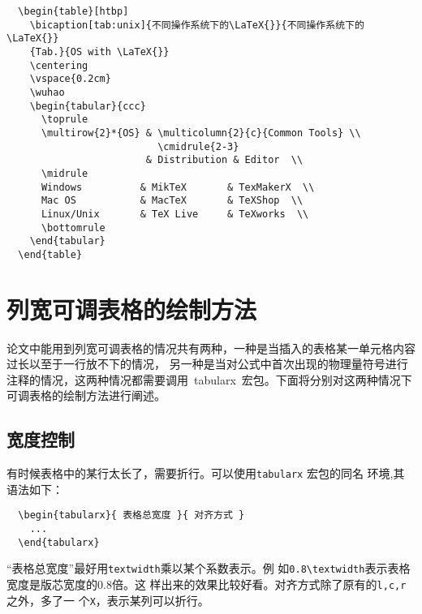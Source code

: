\begin{lstlisting}
  \begin{table}[htbp]
    \bicaption[tab:unix]{不同操作系统下的\LaTeX{}}{不同操作系统下的\LaTeX{}}
    {Tab.}{OS with \LaTeX{}}
    \centering
    \vspace{0.2cm}
    \wuhao
    \begin{tabular}{ccc}
      \toprule
      \multirow{2}*{OS} & \multicolumn{2}{c}{Common Tools} \\
                          \cmidrule{2-3}
                        & Distribution & Editor  \\
      \midrule
      Windows          & MikTeX       & TexMakerX  \\
      Mac OS           & MacTeX       & TeXShop  \\
      Linux/Unix       & TeX Live     & TeXworks  \\
      \bottomrule
    \end{tabular}
  \end{table}
\end{lstlisting}

\section{列宽可调表格的绘制方法}

论文中能用到列宽可调表格的情况共有两种，一种是当插入的表格某一单元格内容过长以至于一行放不下的情况，
另一种是当对公式中首次出现的物理量符号进行注释的情况，这两种情况都需要调用~tabularx~宏包。下面将分别对这两种情况下可调表格的绘制方法进行阐述。

\subsection{宽度控制}

有时候表格中的某行太长了，需要折行。可以使用\texttt{tabularx} 宏包的同名
环境,其语法如下：

\begin{lstlisting}
  \begin{tabularx}{ 表格总宽度 }{ 对齐方式 }
    ...
  \end{tabularx}
\end{lstlisting}

“表格总宽度”最好用\texttt{textwidth}乘以某个系数表示。例
如\texttt{0.8\textbackslash{textwidth}}表示表格宽度是版芯宽度的0.8倍。这
样出来的效果比较好看。对齐方式除了原有的\texttt{l,c,r}之外，多了一
个\texttt{X}，表示某列可以折行。

